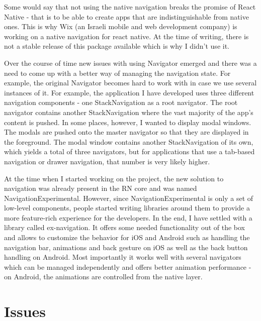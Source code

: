 Some would say that not using the native navigation breaks the promise of React Native - that is to be able to create apps that are indistinguishable from native ones. This is why Wix (an Israeli mobile and web development company) is working on a native navigation for react native. At the time of writing, there is not a stable release of this package available which is why I didn't use it.

Over the course of time new issues with using Navigator emerged and there was a need to come up with a better way of managing the navigation state. For example, the original Navigator becomes hard to work with in case we use several instances of it. For example, the application I have developed uses three different navigation components - one StackNavigation as a root navigator. The root navigator contains another StackNavigation where the vast majority of the app's content is pushed. In some places, however, I wanted to display modal windows. The modals are pushed onto the master navigator so that they are displayed in the foreground. The modal window contains another StackNavigation of its own, which yields a total of three navigators, but for applications that use a tab-based navigation or drawer navigation, that number is very likely higher. 


At the time when I started working on the project, the new solution to navigation was already present in the RN core and was named NavigationExperimental. However, since NavigationExperimental is only a set of low-level components, people started writing libraries around them to provide a more feature-rich experience for the developers. In the end, I have settled with a library called ex-navigation. It offers some needed functionality out of the box and allows to customize the behavior for iOS and Android such as handling the navigation bar, animations and back gesture on iOS as well as the back button handling on Android. Most importantly it works well with several navigators which can be managed independently and offers better animation performance - on Android, the animations are controlled from the native layer.

\section{Issues}

